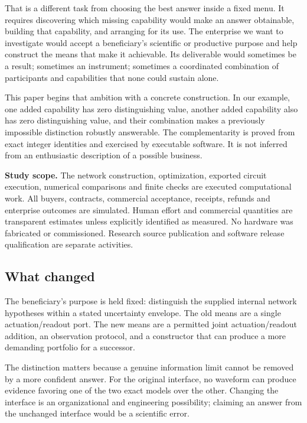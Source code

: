 \documentclass[
  11pt,
]{article}
\begin{document}
That is a different task from choosing the best answer inside a fixed
menu. It requires discovering which missing capability would make an
answer obtainable, building that capability, and arranging for its use.
The enterprise we want to investigate would accept a beneficiary's
scientific or productive purpose and help construct the means that make
it achievable. Its deliverable would sometimes be a result; sometimes an
instrument; sometimes a coordinated combination of participants and
capabilities that none could sustain alone.

This paper begins that ambition with a concrete construction. In our
example, one added capability has zero distinguishing value, another
added capability also has zero distinguishing value, and their
combination makes a previously impossible distinction robustly
answerable. The complementarity is proved from exact integer identities
and exercised by executable software. It is not inferred from an
enthusiastic description of a possible business.

\textbf{Study scope.} The network construction, optimization, exported
circuit execution, numerical comparisons and finite checks are executed
computational work. All buyers, contracts, commercial acceptance,
receipts, refunds and enterprise outcomes are simulated. Human effort
and commercial quantities are transparent estimates unless explicitly
identified as measured. No hardware was fabricated or commissioned.
Research source publication and software release qualification are
separate activities.

\hypertarget{what-changed}{%
\subsection{What changed}\label{what-changed}}

The beneficiary's purpose is held fixed: distinguish the supplied
internal network hypotheses within a stated uncertainty envelope. The
old means are a single actuation/readout port. The new means are a
permitted joint actuation/readout addition, an observation protocol, and
a constructor that can produce a more demanding portfolio for a
successor.

The distinction matters because a genuine information limit cannot be
removed by a more confident answer. For the original interface, no
waveform can produce evidence favoring one of the two exact models over
the other. Changing the interface is an organizational and engineering
possibility; claiming an answer from the unchanged interface would be a
scientific error.
\end{document}
